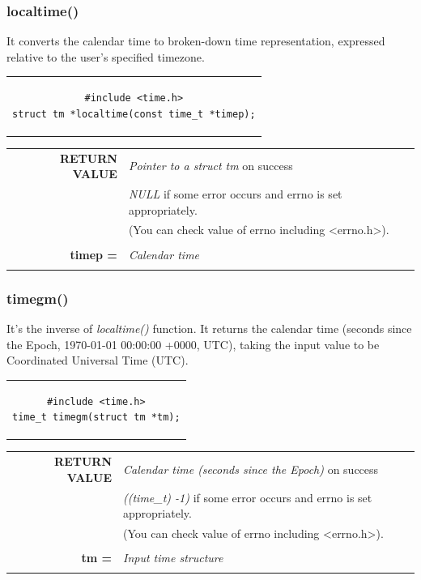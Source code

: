 \subsubsection{localtime()}
It converts the calendar time to broken-down time representation, expressed relative to the user's specified timezone.
\begin{center}
\begin{tabular}{c}
\begin{lstlisting}[linewidth=220pt, basicstyle=\footnotesize\sffamily,]
#include <time.h>
struct tm *localtime(const time_t *timep);
\end{lstlisting}
\end{tabular}
\end{center}

\begin{table}[H]
\centering\footnotesize
\begin{tabular}{rl}
\textbf{RETURN VALUE} & {\textit{Pointer to a struct tm} on success}\\
{} & {\textit{NULL} if some error occurs and errno is set appropriately.}\\
{} & {(You can check value of errno including <errno.h>).}\\
& \\
\textbf{timep =} & {\textit{Calendar time}}\\
& \\
\end{tabular}
\end{table}

\subsubsection{timegm()}
It's the inverse of \textit{localtime()} function. It returns the calendar time (seconds since the Epoch, 1970-01-01 00:00:00 +0000, UTC), taking the input value to be Coordinated Universal Time (UTC).
\begin{center}
\begin{tabular}{c}
\begin{lstlisting}[linewidth=150pt, basicstyle=\footnotesize\sffamily,]
#include <time.h>
time_t timegm(struct tm *tm);
\end{lstlisting}
\end{tabular}
\end{center}

\begin{table}[H]
\centering\footnotesize
\begin{tabular}{rl}
\textbf{RETURN VALUE} & {\textit{Calendar time (seconds since the Epoch)} on success}\\
{} & {\textit{((time\_t) -1)} if some error occurs and errno is set appropriately.}\\
{} & {(You can check value of errno including <errno.h>).}\\
& \\
\textbf{tm =} & {\textit{Input time structure}}\\
& \\
\end{tabular}
\end{table}

